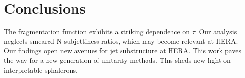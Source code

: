 \section{Conclusions}\label{sec:conclusions}

The fragmentation function exhibits a striking dependence on $\tau$. Our
analysis neglects smeared N-subjettiness ratios, which may become
relevant at HERA. Our findings open new avenues for jet substructure at
HERA. This work paves the way for a new generation of unitarity methods.
This sheds new light on interpretable sphalerons.

